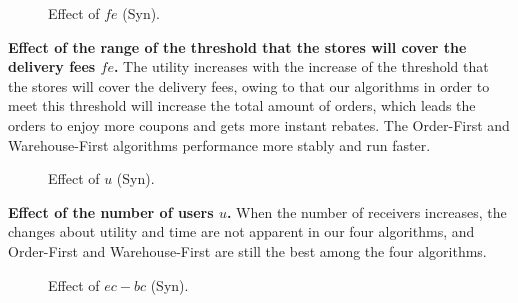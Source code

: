 \begin{figure}[t!]\centering 
	\subfigcapskip=-5pt
	\hfill
	\addtocounter{subfigure}{-1}\vspace{-3ex}
	\figureCaptionMargin
	\vspace{-1ex}
	\caption{\small Effect of $fe$ (Syn).}\figureBelowMargin
	\label{fig:syn_4}
\end{figure}

\textbf{Effect of the range of the threshold that the stores will cover the delivery fees $fe$.} The utility increases with the increase of the threshold that the stores will cover the delivery fees, owing to that our algorithms in order to meet this threshold will increase the total amount of orders, which leads the orders to enjoy more coupons and gets more instant rebates. The Order-First and Warehouse-First algorithms performance more stably and run faster.

\begin{figure}[t!]\centering 
	\subfigcapskip=-5pt
	\hfill
	\addtocounter{subfigure}{-1}\vspace{-3ex}
	\figureCaptionMargin
	\vspace{-1ex}
	\caption{\small Effect of $u$ (Syn).}\figureBelowMargin
	\label{fig:syn_6}
\end{figure}

\textbf{Effect of the number of users $u$.} When the number of receivers increases, the changes about utility and time are not apparent in our four algorithms, and Order-First and Warehouse-First are still the best among the four algorithms.

\begin{figure}[t!]\centering
	\subfigcapskip=-5pt
	\hfill
	\addtocounter{subfigure}{-1}\vspace{-3ex}
	\figureCaptionMargin
	\vspace{-1ex}
	\caption{\small Effect of $ec-bc$ (Syn).}\figureBelowMargin
	\label{fig:syn_9}
\end{figure}

